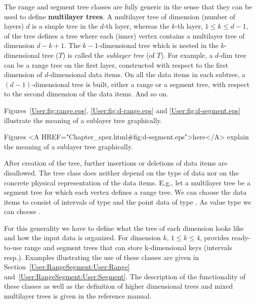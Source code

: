 The range and segment tree classes are fully generic in the sense that they 
can be used to define {\bf{multilayer trees}}. 
A multilayer tree of dimension (number of layers) $d$ is a simple tree in 
the $d$-th layer, whereas the $k$-th layer, $1\leq k\leq d-1$, of the tree 
defines a tree where each (inner) vertex contains a multilayer tree of 
dimension $d-k+1$.
The $k-1$-dimensional tree which is nested in the $k$-dimensional tree 
($T$) is called the {\em sublayer tree} (of $T$).
For example, a $d$-dim tree can be a range tree on the first layer, 
constructed with respect to the first dimension of $d$-dimensional data 
items.
On all the data items in each subtree, a $(d-1)$-dimensional tree is built,
either a range or a segment tree, with respect to the second dimension of 
the data items.
And so on.
\begin{ccTexOnly}
Figures~\ref{User:fig:range.eps}, \ref{User:fig:d-range.eps} and
\ref{User:fig:d-segment.eps} illustrate the meaning of a sublayer tree
graphically.
\end{ccTexOnly}
\begin{ccHtmlOnly}Figures 
<A HREF="Chapter_spez.html#fig:d-segment.eps">here</A> explain the meaning 
of a sublayer tree graphically.
\end{ccHtmlOnly}

After creation of the tree, further insertions or deletions of data items 
are disallowed.  
The tree class does neither depend on the type of data nor on the concrete
physical representation of the data items.
E.g., let a multilayer tree be a segment tree for which each vertex
defines a range tree. 
We can choose the data items to consist of intervals of type  
and the point data of type . 
As value type we can choose  .

For this generality we have to
define what the tree of each dimension looks like and how the
input data is organized.
For dimension $k$, $1\le k\le 4$, \cgal\/ provides ready-to-use
range and segment trees that can store k-dimensional keys
(intervals resp.). 
Examples illustrating the use of these classes are given in
Section~\ref{User:RangeSegment:User:Range}
and~\ref{User:RangeSegment:User:Segment}.
The description of the functionality of these classes as well as
the definition of higher dimensional trees and mixed multilayer
trees is given in the reference manual.

